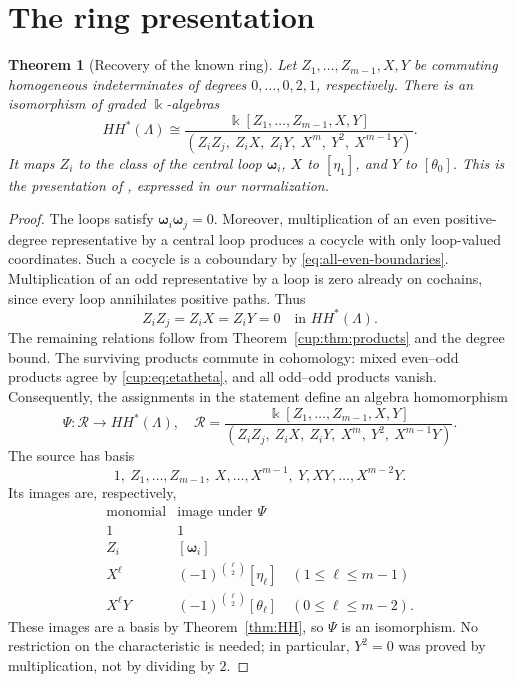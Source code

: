 \documentclass[a4paper,11pt,oneside,reqno]{amsart}
\newtheorem{theorem}{Theorem}[section]
\theoremstyle{definition}
\numberwithin{equation}{section}
\begin{document}
\section{The ring presentation}

\begin{theorem}[Recovery of the known ring]\label{cup:thm:ring}
Let $Z_1,\ldots,Z_{m-1},X,Y$ be commuting homogeneous
indeterminates of degrees $0,\ldots,0,2,1$, respectively.
There is an isomorphism of graded $\Bbbk$-algebras
\begin{equation}\label{cup:eq:ring}
 \boxed{
 HH^*(\Lambda)\cong
 \frac{\Bbbk[Z_1,\ldots,Z_{m-1},X,Y]}
 {(Z_iZ_j,\ Z_iX,\ Z_iY,\ X^m,\ Y^2,\ X^{m-1}Y)}.}
\end{equation}
It maps $Z_i$ to the class of the central loop
$\boldsymbol\omega_i$, $X$ to $[\eta_1]$, and $Y$ to
$[\theta_0]$. This is the presentation of
\cite[Theorem~4.2]{LiXuChen}, expressed in our normalization.
\end{theorem}

\begin{proof}
The loops satisfy $\boldsymbol\omega_i\boldsymbol\omega_j=0$.
Moreover, multiplication of an even positive-degree representative
by a central loop produces a cocycle with only loop-valued
coordinates. Such a cocycle is a coboundary by
\eqref{eq:all-even-boundaries}. Multiplication of an odd representative
by a loop is zero already on cochains, since every loop annihilates
positive paths. Thus
\[
 Z_iZ_j=Z_iX=Z_iY=0\quad\text{in }HH^*(\Lambda).
\]
The remaining relations follow from Theorem~\ref{cup:thm:products}
and the degree bound. The surviving products commute in cohomology:
mixed even--odd products agree by \eqref{cup:eq:etatheta}, and all
odd--odd products vanish. Consequently, the assignments in the
statement define an algebra homomorphism
\[
 \Psi:\mathcal R\longrightarrow HH^*(\Lambda),
 \quad
 \mathcal R=
 \frac{\Bbbk[Z_1,\ldots,Z_{m-1},X,Y]}
 {(Z_iZ_j,\ Z_iX,\ Z_iY,\ X^m,\ Y^2,\ X^{m-1}Y)}.
\]
The source has basis
\[
 1,\ Z_1,\ldots,Z_{m-1},\
 X,\ldots,X^{m-1},\
 Y,XY,\ldots,X^{m-2}Y.
\]
Its images are, respectively,
\begin{equation}\label{cup:eq:ring-basis-map}
\begin{array}{c|c}
 \text{monomial}&\text{image under }\Psi\\\hline
 1&1\\
 Z_i&[\boldsymbol\omega_i]\\
 X^\ell&(-1)^{\binom\ell2}[\eta_\ell]
 \quad(1\leq\ell\leq m-1)\\
 X^\ell Y&(-1)^{\binom\ell2}[\theta_\ell]
 \quad(0\leq\ell\leq m-2).
\end{array}
\end{equation}
These images are a basis by Theorem~\ref{thm:HH}, so $\Psi$ is an
isomorphism. No restriction on the characteristic is needed; in
particular, $Y^2=0$ was proved by multiplication, not by dividing
by $2$.
\end{proof}
\end{document}
